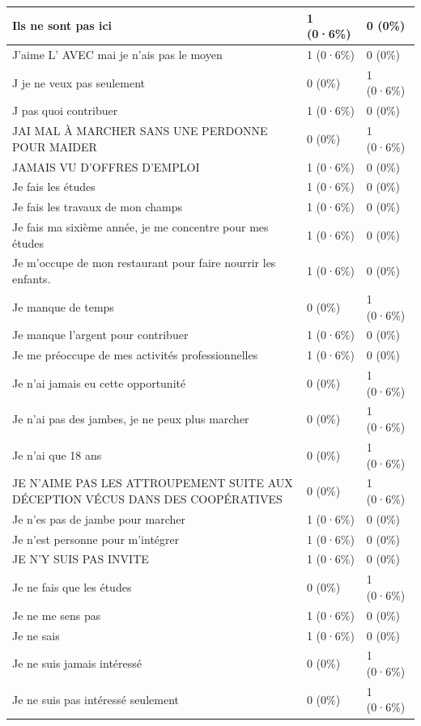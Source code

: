 \documentclass[
]{book}
\begin{document}
\begin{tabular}{l|l|l}
\hline
Ils ne sont pas ici & 1 (0·6\%) & 0 (0\%)\\
\hline
J'aime L' AVEC mai je n'ais pas le moyen & 1 (0·6\%) & 0 (0\%)\\
\hline
J je ne veux pas seulement & 0 (0\%) & 1 (0·6\%)\\
\hline
J pas quoi contribuer & 1 (0·6\%) & 0 (0\%)\\
\hline
JAI MAL À MARCHER SANS UNE PERDONNE POUR MAIDER & 0 (0\%) & 1 (0·6\%)\\
\hline
JAMAIS VU D'OFFRES D'EMPLOI & 1 (0·6\%) & 0 (0\%)\\
\hline
Je fais les études & 1 (0·6\%) & 0 (0\%)\\
\hline
Je fais les travaux de mon champs & 1 (0·6\%) & 0 (0\%)\\
\hline
Je fais ma sixième année, je me concentre pour mes études & 1 (0·6\%) & 0 (0\%)\\
\hline
Je m'occupe de mon restaurant pour faire nourrir les enfants. & 1 (0·6\%) & 0 (0\%)\\
\hline
Je manque de temps & 0 (0\%) & 1 (0·6\%)\\
\hline
Je manque l'argent pour contribuer & 1 (0·6\%) & 0 (0\%)\\
\hline
Je me préoccupe de mes activités professionnelles & 1 (0·6\%) & 0 (0\%)\\
\hline
Je n'ai jamais eu cette opportunité & 0 (0\%) & 1 (0·6\%)\\
\hline
Je n'ai pas des jambes, je ne peux plus marcher & 0 (0\%) & 1 (0·6\%)\\
\hline
Je n'ai que 18 ans & 0 (0\%) & 1 (0·6\%)\\
\hline
JE N'AIME PAS LES ATTROUPEMENT SUITE AUX DÉCEPTION VÉCUS DANS DES COOPÉRATIVES & 0 (0\%) & 1 (0·6\%)\\
\hline
Je n'es pas de jambe pour marcher & 1 (0·6\%) & 0 (0\%)\\
\hline
Je n'est personne pour m'intégrer & 1 (0·6\%) & 0 (0\%)\\
\hline
JE N'Y SUIS PAS INVITE & 1 (0·6\%) & 0 (0\%)\\
\hline
Je ne fais que les études & 0 (0\%) & 1 (0·6\%)\\
\hline
Je ne me sens pas & 1 (0·6\%) & 0 (0\%)\\
\hline
Je ne sais & 1 (0·6\%) & 0 (0\%)\\
\hline
Je ne suis jamais intéressé & 0 (0\%) & 1 (0·6\%)\\
\hline
Je ne suis pas intéressé seulement & 0 (0\%) & 1 (0·6\%)\\

\end{tabular}
\end{document}
